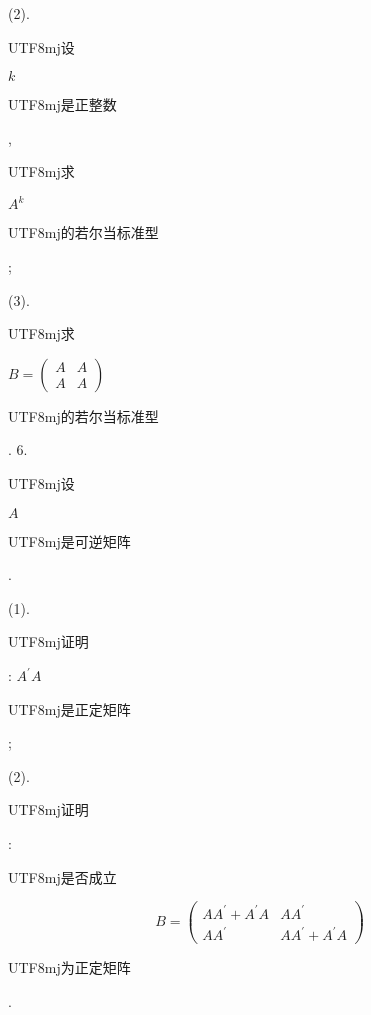 \documentclass[10pt]{article}
\begin{document}
(2). \begin{CJK}{UTF8}{mj}设\end{CJK} $k$ \begin{CJK}{UTF8}{mj}是正整数\end{CJK}, \begin{CJK}{UTF8}{mj}求\end{CJK} $A^{k}$ \begin{CJK}{UTF8}{mj}的若尔当标准型\end{CJK};

(3). \begin{CJK}{UTF8}{mj}求\end{CJK} $B=\left(\begin{array}{ll}A & A \\ A & A\end{array}\right)$ \begin{CJK}{UTF8}{mj}的若尔当标准型\end{CJK}. 6. \begin{CJK}{UTF8}{mj}设\end{CJK} $A$ \begin{CJK}{UTF8}{mj}是可逆矩阵\end{CJK}.

(1). \begin{CJK}{UTF8}{mj}证明\end{CJK}: $A^{\prime} A$ \begin{CJK}{UTF8}{mj}是正定矩阵\end{CJK};

(2). \begin{CJK}{UTF8}{mj}证明\end{CJK}: \begin{CJK}{UTF8}{mj}是否成立\end{CJK}
$$
B=\left(\begin{array}{cc}
A A^{\prime}+A^{\prime} A & A A^{\prime} \\
A A^{\prime} & A A^{\prime}+A^{\prime} A
\end{array}\right)
$$
\begin{CJK}{UTF8}{mj}为正定矩阵\end{CJK}.
\end{document}
